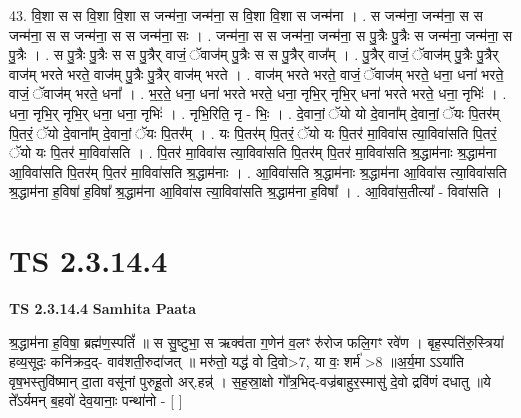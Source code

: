 \documentclass[17pt]{extarticle}
\begin{document}
43. वि॒शा स स वि॒शा वि॒शा स जन्म॑ना॒ जन्म॑ना॒ स वि॒शा वि॒शा स जन्म॑ना । . स जन्म॑ना॒ जन्म॑ना॒ स स जन्म॑ना॒ स स जन्म॑ना॒ स स जन्म॑ना॒ सः । . जन्म॑ना॒ स स जन्म॑ना॒ जन्म॑ना॒ स पु॒त्रैः पु॒त्रैः स जन्म॑ना॒ जन्म॑ना॒ स पु॒त्रैः । . स पु॒त्रैः पु॒त्रैः स स पु॒त्रैर् वाजं॒ ॅवाज॑म् पु॒त्रैः स स पु॒त्रैर् वाज᳚म् । . पु॒त्रैर् वाजं॒ ॅवाज॑म् पु॒त्रैः पु॒त्रैर् वाज॑म् भरते भरते॒ वाज॑म् पु॒त्रैः पु॒त्रैर् वाज॑म् भरते । . वाज॑म् भरते भरते॒ वाजं॒ ॅवाज॑म् भरते॒ धना॒ धना॑ भरते॒ वाजं॒ ॅवाज॑म् भरते॒ धना᳚ । . भ॒र॒ते॒ धना॒ धना॑ भरते भरते॒ धना॒ नृभि॒र् नृभि॒र् धना॑ भरते भरते॒ धना॒ नृभिः॑ । . धना॒ नृभि॒र् नृभि॒र् धना॒ धना॒ नृभिः॑ । . नृभि॒रिति॒ नृ - भिः॒ । . दे॒वानां॒ ॅयो यो दे॒वाना᳚म् दे॒वानां॒ ॅयः पि॒तर॑म् पि॒तरं॒ ॅयो दे॒वाना᳚म् दे॒वानां॒ ॅयः पि॒तर᳚म् । . यः पि॒तर॑म् पि॒तरं॒ ॅयो यः पि॒तर॑ मा॒विवा॑स त्या॒विवा॑सति पि॒तरं॒ ॅयो यः पि॒तर॑ मा॒विवा॑सति । . पि॒तर॑ मा॒विवा॑स त्या॒विवा॑सति पि॒तर॑म् पि॒तर॑ मा॒विवा॑सति श्र॒द्धाम॑नाः श्र॒द्धाम॑ना आ॒विवा॑सति पि॒तर॑म् पि॒तर॑ मा॒विवा॑सति श्र॒द्धाम॑नाः । . आ॒विवा॑सति श्र॒द्धाम॑नाः श्र॒द्धाम॑ना आ॒विवा॑स त्या॒विवा॑सति श्र॒द्धाम॑ना ह॒विषा॑ ह॒विषा᳚ श्र॒द्धाम॑ना आ॒विवा॑स त्या॒विवा॑सति श्र॒द्धाम॑ना ह॒विषा᳚ । . आ॒विवा॑स॒तीत्या᳚ - विवा॑सति । \newline
\pagebreak
{}
\section*{ TS 2.3.14.4 }

\textbf{TS 2.3.14.4 } \newline
\textbf{Samhita Paata} \newline

श्र॒द्धाम॑ना ह॒विषा॒ ब्रह्म॑ण॒स्पतिं᳚ ॥ स सु॒ष्टुभा॒ स ऋक्व॑ता ग॒णेन॑ व॒लꣳ रु॑रोज फलि॒गꣳ रवे॑ण । बृह॒स्पति॑रु॒स्त्रिया॑ हव्य॒सूदः॒ कनि॑क्रद॒द्- वाव॑शती॒रुदा॑जत् ॥ मरु॑तो॒ यद्ध॑ वो दि॒वो>7, या वः॒ शर्म॑ >8 ॥अ॒र्य॒मा ऽऽया॑ति वृष॒भस्तुवि॑ष्मान् दा॒ता वसू॑नां पुरुहू॒तो अर्.हन्न्॑ । स॒ह॒स्रा॒क्षो गो᳚त्र॒भिद्-वज्र॑बाहुर॒स्मासु॑ दे॒वो द्रवि॑णं दधातु ॥ये ते᳚ऽर्यमन् ब॒हवो॑ देव॒यानाः॒ पन्था॑नो - [  ] \newline
\end{document}
